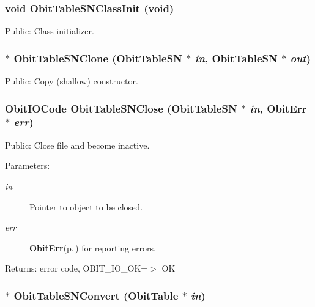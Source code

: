 \subsubsection{\setlength{\rightskip}{0pt plus 5cm}void Obit\-Table\-SNClass\-Init (void)}\label{ObitTableSN_8h_a10}


Public: Class initializer. 

\subsubsection{$\ast$ Obit\-Table\-SNClone ({\bf Obit\-Table\-SN} $\ast$ {\em in}, {\bf Obit\-Table\-SN} $\ast$ {\em out})}\label{ObitTableSN_8h_a15}


Public: Copy (shallow) constructor. 

\subsubsection{\setlength{\rightskip}{0pt plus 5cm}Obit\-IOCode Obit\-Table\-SNClose ({\bf Obit\-Table\-SN} $\ast$ {\em in}, {\bf Obit\-Err} $\ast$ {\em err})}\label{ObitTableSN_8h_a21}


Public: Close file and become inactive. 

\begin{Desc}
\item[Parameters:]
\begin{description}
\item[{\em in}]Pointer to object to be closed. \item[{\em err}]{\bf Obit\-Err}{\rm (p.\,\pageref{structObitErr})} for reporting errors. \end{description}
\end{Desc}
\begin{Desc}
\item[Returns:]error code, OBIT\_\-IO\_\-OK=$>$ OK \end{Desc}
\subsubsection{$\ast$ Obit\-Table\-SNConvert ({\bf Obit\-Table} $\ast$ {\em in})}\label{ObitTableSN_8h_a16}



